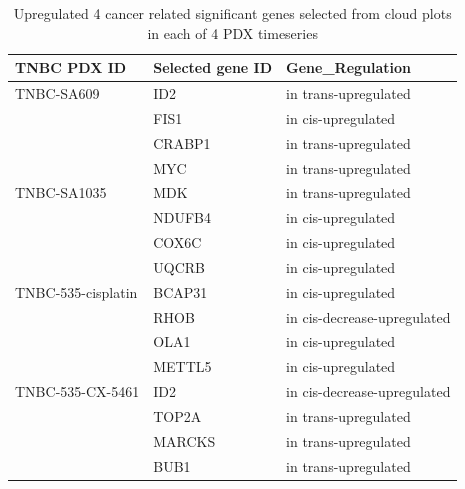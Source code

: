 
 \begin{table}[htbp]
   \centering
   \caption{Upregulated 4 cancer related significant genes selected from cloud plots in each of 4 PDX timeseries}
     \begin{tabular}{|r|l|l|}
     \hline
     \multicolumn{1}{|l|}{TNBC PDX ID} & Selected gene ID & Gene\_Regulation \\
     \hline
     \multicolumn{1}{|l|}{TNBC-SA609} & ID2 & in trans-upregulated \\
       & FIS1  & in cis-upregulated \\
       & CRABP1  & in trans-upregulated \\
       & MYC  & in trans-upregulated \\
     \multicolumn{1}{|l|}{TNBC-SA1035} & MDK & in trans-upregulated \\
       & NDUFB4  & in cis-upregulated \\
       & COX6C  & in cis-upregulated \\
       & UQCRB  & in cis-upregulated \\
     \multicolumn{1}{|l|}{TNBC-535-cisplatin} & BCAP31 & in cis-upregulated \\
       & RHOB  & in cis-decrease-upregulated \\
       & OLA1  & in cis-upregulated \\
       & METTL5  & in cis-upregulated \\
     \multicolumn{1}{|l|}{TNBC-535-CX-5461} & ID2  & in cis-decrease-upregulated \\
       & TOP2A  & in trans-upregulated \\
       & MARCKS  & in trans-upregulated \\
       & BUB1  & in trans-upregulated \\
       \hline
     \end{tabular}%
   \label{tab:selected4genestable}%
 \end{table}%
